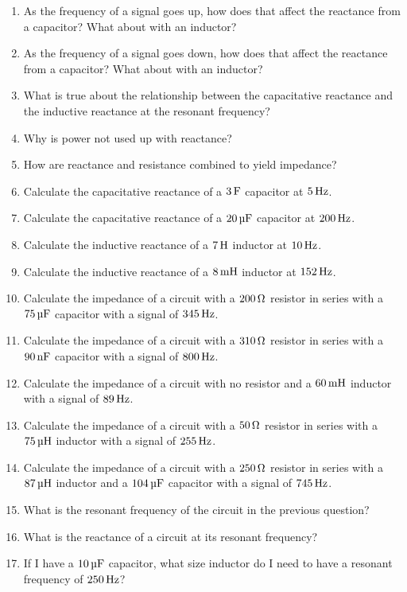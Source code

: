 \begin{enumerate}
\item As the frequency of a signal goes up, how does that affect the reactance from a capacitor?  What about with an inductor?
\item As the frequency of a signal goes down, how does that affect the reactance from a capacitor?  What about with an inductor?
\item What is true about the relationship between the capacitative reactance and the inductive reactance at the resonant frequency?
\item Why is power not used up with reactance?
\item How are reactance and resistance combined to yield impedance?
\item Calculate the capacitative reactance of a $3\,\si{\farad}$ capacitor at $5\,\si{\hertz}$.
\item Calculate the capacitative reactance of a $20\,\si{\micro\farad}$ capacitor at $200\,\si{\hertz}$.
\item Calculate the inductive reactance of a $7\myhy$ inductor at $10\,\si{\hertz}$.
\item Calculate the inductive reactance of a $8\mymhy$ inductor at $152\,\si{\hertz}$.
\item Calculate the impedance of a circuit with a $200\,\si{\ohm}$ resistor in series with a $75\,\si{\micro\farad}$ capacitor with a signal of $345\,\si{\hertz}$.
\item Calculate the impedance of a circuit with a $310\,\si{\ohm}$ resistor in series with a $90\,\si{\nano\farad}$ capacitor with a signal of $800\,\si{\hertz}$.
\item Calculate the impedance of a circuit with no resistor and a $60\mymhy$ inductor with a signal of $89\,\si{\hertz}$.
\item Calculate the impedance of a circuit with a $50\,\si{\ohm}$ resistor in series with a $75\myuhy$ inductor with a signal of $255\,\si{\hertz}$.
\item Calculate the impedance of a circuit with a $250\,\si{\ohm}$ resistor in series with a $87\myuhy$ inductor and a $104\,\si{\micro\farad}$ capacitor with a signal of $745\,\si{\hertz}$.
\item What is the resonant frequency of the circuit in the previous question?
\item What is the reactance of a circuit at its resonant frequency?
\item If I have a $10\,\si{\micro\farad}$ capacitor, what size inductor do I need to have a resonant frequency of $250\,\si{\hertz}$?
\end{enumerate}

